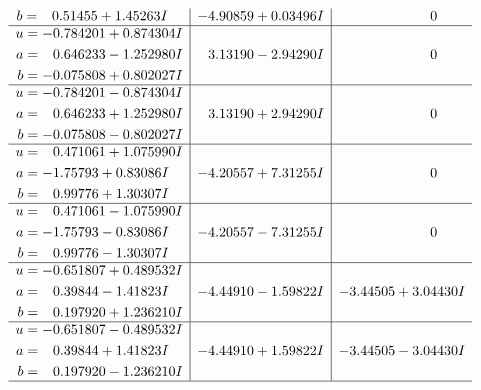 \documentclass[1p]{elsarticle_modified}
\theoremstyle{definition}
\begin{document}
$$\begin{array}{c|c|c}
\begin{aligned}
b &= \phantom{-}0.51455 + 1.45263 I\end{aligned}
 & -4.90859 + 0.03496 I & \phantom{-0.000000 } 0 \\ \hline\begin{aligned}
u &= -0.784201 + 0.874304 I \\
a &= \phantom{-}0.646233 - 1.252980 I \\
b &= -0.075808 + 0.802027 I\end{aligned}
 & \phantom{-}3.13190 - 2.94290 I & \phantom{-0.000000 } 0 \\ \hline\begin{aligned}
u &= -0.784201 - 0.874304 I \\
a &= \phantom{-}0.646233 + 1.252980 I \\
b &= -0.075808 - 0.802027 I\end{aligned}
 & \phantom{-}3.13190 + 2.94290 I & \phantom{-0.000000 } 0 \\ \hline\begin{aligned}
u &= \phantom{-}0.471061 + 1.075990 I \\
a &= -1.75793 + 0.83086 I \\
b &= \phantom{-}0.99776 + 1.30307 I\end{aligned}
 & -4.20557 + 7.31255 I & \phantom{-0.000000 } 0 \\ \hline\begin{aligned}
u &= \phantom{-}0.471061 - 1.075990 I \\
a &= -1.75793 - 0.83086 I \\
b &= \phantom{-}0.99776 - 1.30307 I\end{aligned}
 & -4.20557 - 7.31255 I & \phantom{-0.000000 } 0 \\ \hline\begin{aligned}
u &= -0.651807 + 0.489532 I \\
a &= \phantom{-}0.39844 - 1.41823 I \\
b &= \phantom{-}0.197920 + 1.236210 I\end{aligned}
 & -4.44910 - 1.59822 I & -3.44505 + 3.04430 I \\ \hline\begin{aligned}
u &= -0.651807 - 0.489532 I \\
a &= \phantom{-}0.39844 + 1.41823 I \\
b &= \phantom{-}0.197920 - 1.236210 I\end{aligned}
 & -4.44910 + 1.59822 I & -3.44505 - 3.04430 I\\
 \hline 
 \end{array}$$\newpage$$\begin{array}{c|c|c}  

\end{array}$$
\end{document}
